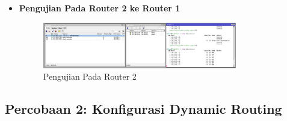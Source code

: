 \begin{itemize}
    \item \textbf{Pengujian Pada Router 2 ke Router 1}
    \begin{figure} [H]
        \centering
        \includegraphics[width=0.8\textwidth]{img/percobaan 1_2_hasil.jpeg}
        \caption{Pengujian Pada Router 2}
        \label{fig:ping2}
    \end{figure}
\end{itemize}

\subsection*{Percobaan 2: Konfigurasi Dynamic Routing}

